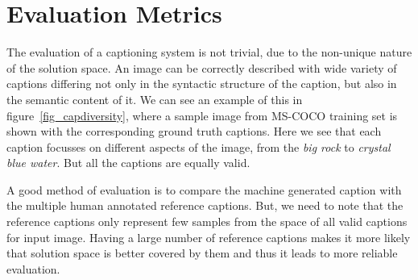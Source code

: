\section{Evaluation Metrics} \label{sec:EvaluationMetrics} The evaluation of a
captioning system is not trivial, due to the non-unique nature of the
solution space.
An image can be correctly described with wide variety of captions differing not
only in the syntactic structure of the caption, but also in the semantic content
of it.
We can see an example of this in figure~\ref{fig_capdiversity}, where a sample
image from MS-COCO training set is shown with the corresponding ground truth
captions.
Here we see that each caption focusses on different aspects of the image, from
the \emph{big rock} to \emph{crystal blue water}.
But all the captions are equally valid.

A good method of evaluation is to compare the machine generated caption with
the multiple human annotated reference captions.
But, we need to note that the reference captions only represent few samples from
the space of all valid captions for input image.
Having a large number of reference captions makes it more likely that solution space is
better covered by them and thus it leads to more reliable evaluation.

